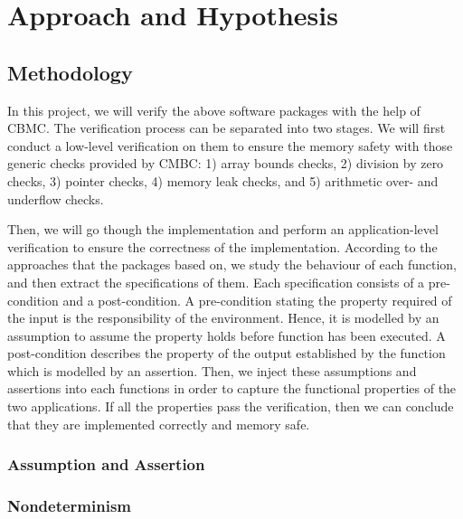 \chapter{Approach and Hypothesis} %

\section{Methodology}
In this project, we will verify the above software packages with the help of CBMC. The verification process can be separated into two stages. We will first conduct a low-level verification on them to ensure the memory safety with those generic checks provided by CMBC: 1) array bounds checks, 2) division by zero checks, 3) pointer checks, 4) memory leak checks, and 5) arithmetic over- and underflow checks.

Then, we will go though the implementation and perform an application-level verification to ensure the correctness of the implementation. According to the approaches that the packages based on, we study the behaviour of each function, and then extract the specifications of them. Each specification consists of a pre-condition and a post-condition. A pre-condition stating the property required of the input is the responsibility of the environment. Hence, it is modelled by an assumption to assume the property holds before function has been executed. A post-condition describes the property of the output established by the function which is modelled by an assertion. Then, we inject these assumptions and assertions into each functions in order to capture the functional properties of the two applications. If all the properties pass the verification, then we can conclude that they are implemented correctly and memory safe.

\subsection{Assumption and Assertion}

\subsection{Nondeterminism}

